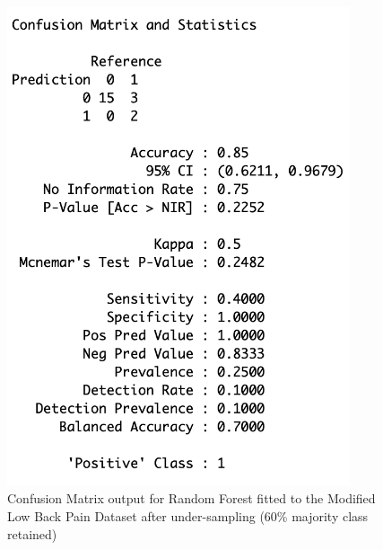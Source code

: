 \begin{figure}[!htbp]
\begin{minipage}{0.45\textwidth}
        \includegraphics[width=0.9\textwidth]{ThesisTemplate/appendix/images/Chapter5Appendix/ConfusionMatrix60/modLBP.png}
        \caption{Confusion Matrix output for Random Forest fitted to the Modified Low Back Pain Dataset after under-sampling (60\% majority class retained)}
        \label{fig:my_label}
    \end{minipage}
\end{figure}

